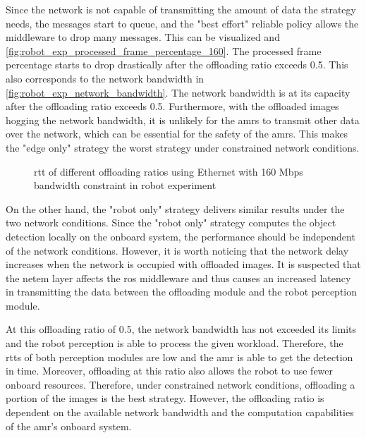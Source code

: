 Since the network is not capable of transmitting the amount of data the strategy needs, the messages start to queue, and the "best effort" reliable policy allows the middleware to drop many messages. This can be visualized and \cref{fig:robot_exp_processed_frame_percentage_160}. The processed frame percentage starts to drop drastically after the offloading ratio exceeds 0.5. This also corresponds to the network bandwidth in \cref{fig:robot_exp_network_bandwidth}. The network bandwidth is at its capacity after the offloading ratio exceeds 0.5. Furthermore, with the offloaded images hogging the network bandwidth, it is unlikely for the \glspl{amr} to transmit other data over the network, which can be essential for the safety of the \glspl{amr}. This makes the "edge only" strategy the worst strategy under constrained network conditions. 

\begin{figure}
    \centering
    
    \caption{\gls{rtt} of different offloading ratios using Ethernet with 160 Mbps bandwidth constraint in robot experiment}
    \label{fig:robot_exp_rtt_160}
\end{figure}

On the other hand, the "robot only" strategy delivers similar results under the two network conditions. Since the "robot only" strategy computes the object detection locally on the onboard system, the performance should be independent of the network conditions. However, it is worth noticing that the network delay increases when the network is occupied with offloaded images. It is suspected that the \gls{netem} layer affects the \gls{ros} middleware and thus causes an increased latency in transmitting the data between the offloading module and the robot perception module. 

 At this offloading ratio of 0.5, the network bandwidth has not exceeded its limits and the robot perception is able to process the given workload. Therefore, the \glspl{rtt} of both perception modules are low and the \gls{amr} is able to get the detection in time. Moreover, offloading at this ratio also allows the robot to use fewer onboard resources. Therefore, under constrained network conditions, offloading a portion of the images is the best strategy. However, the offloading ratio is dependent on the available network bandwidth and the computation capabilities of the \gls{amr}'s onboard system.

